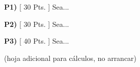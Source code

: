 \documentclass{article}
\begin{document}


\newpage
\noindent\textbf{P1) } \textsf{[ 30 Pts. ]} Sea...


\newpage
\noindent\textbf{P2) } \textsf{[ 30 Pts. ]} Sea...


\newpage
\noindent\textbf{P3) } \textsf{[ 40 Pts. ]} Sea...


\newpage
\noindent\textsf{(hoja adicional para cálculos, no arrancar)}
\end{document}

